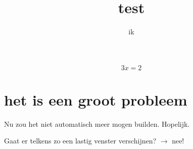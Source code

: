 \documentclass{article}
\title{test}
\author{ik}
\begin{document}
\maketitle

\begin{equation}
    3x=2
\end{equation}

\section{het is een groot probleem}
Nu zou het niet automatisch meer mogen builden. Hopelijk.


Gaat er telkens zo een lastig venster verschijnen?
 $\longrightarrow$ nee!
\end{document}
